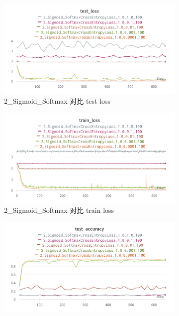 \documentclass{article}
\begin{document}
\begin{figure}[htbp]
	\centering
	\begin{subfigure}{0.475\textwidth}
		\centering
		\includegraphics[width=1\textwidth]{../pics/消减率_2_Sigmoid_SoftmaxCross_test_loss.png}
		\caption{2\_Sigmoid\_Softmax 对比 test loss}
	\end{subfigure}
	\begin{subfigure}{0.475\textwidth}
		\centering
		\includegraphics[width=1\textwidth]{../pics/消减率_2_Sigmoid_SoftmaxCross_train_loss.png}
		\caption{2\_Sigmoid\_Softmax 对比 train loss}
	\end{subfigure}
	\begin{subfigure}{0.475\textwidth}
		\centering
		\includegraphics[width=1\textwidth]{../pics/消减率_2_Sigmoid_SoftmaxCross_test_acc.png}

\end{subfigure}
\end{figure}
\end{document}
